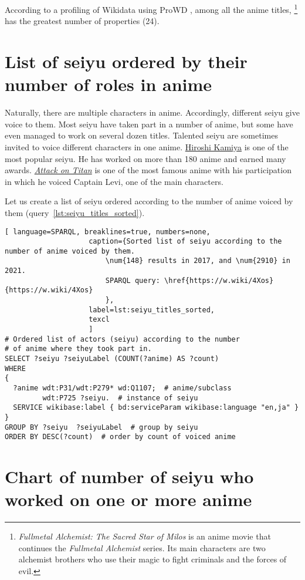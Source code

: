 According to a profiling of Wikidata using ProWD \autocite{anime_prowd}, among all the anime titles, \footnote{\emph{Fullmetal Alchemist: The Sacred Star of Milos} is an anime movie that continues the \emph{Fullmetal Alchemist} series. Its main characters are two alchemist brothers who use their magic to fight criminals and the forces of evil.} has the greatest number of properties (\num{24}).

\section{List of seiyu ordered by their number of roles in anime}

Naturally, there are multiple characters in anime. Accordingly, different seiyu give voice to them. Most seiyu have taken part in a number of anime, but some have even managed to work on several dozen titles. Talented seiyu are sometimes invited to voice different characters in one anime. \href{https://w.wiki/4UFa}{Hiroshi Kamiya} is one of the most popular seiyu. He has worked on more than 180 anime and earned many awards. \href{https://w.wiki/4UFh}{\emph{Attack on Titan}} is one of the most famous anime with his participation in which he voiced Captain Levi, one of the main characters.

Let us create a list of seiyu ordered according to the number of anime voiced by them (query~\ref{lst:seiyu_titles_sorted}).

\begin{lstlisting}[ language=SPARQL, breaklines=true, numbers=none,
                    caption={Sorted list of seiyu according to the number of anime voiced by them.
                        \num{148} results in 2017, and \num{2910} in 2021.
                        SPARQL query: \href{https://w.wiki/4Xos}{https://w.wiki/4Xos}
                        },
                    label=lst:seiyu_titles_sorted,
                    texcl 
                    ]
# Ordered list of actors (seiyu) according to the number
# of anime where they took part in.
SELECT ?seiyu ?seiyuLabel (COUNT(?anime) AS ?count)
WHERE
{
  ?anime wdt:P31/wdt:P279* wd:Q1107;  # anime/subclass
         wdt:P725 ?seiyu.  # instance of seiyu
  SERVICE wikibase:label { bd:serviceParam wikibase:language "en,ja" }
}
GROUP BY ?seiyu  ?seiyuLabel  # group by seiyu 
ORDER BY DESC(?count)  # order by count of voiced anime
\end{lstlisting}%

\section{Chart of number of seiyu who worked on one or more anime}

